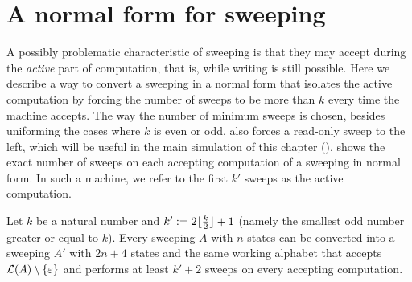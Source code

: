 \section{A normal form for sweeping \kDLAs}\label{sec:equiv-swep-dla}
A possibly problematic characteristic of sweeping \kDLAs is that they may accept during the \emph{active} part of computation, that is, while writing is still possible.
Here we describe a way to convert a sweeping \kDLA in a normal form that isolates the active computation by forcing the number of sweeps to be more than $k$ every time the machine accepts.
The way the number of minimum sweeps is chosen, besides uniforming the cases where $k$ is even or odd, also forces a read-only sweep to the left, which will be useful in the main simulation of this chapter ().
 shows the exact number of sweeps on each accepting computation of a sweeping \kDLA in normal form.
In such a machine, we refer to the first $k'$ sweeps as the active computation.
\begin{thrm}\label{thm:equiv-swep-dla}
	Let $k$ be a natural number and $k':=2\lfloor \frac{k}{2} \rfloor+1$ (namely the smallest odd number greater or equal to $k$).
	Every sweeping \kDLA $A$ with $n$ states can be converted into a sweeping \kDLA $A'$ with $2n+4$ states and the same working alphabet that accepts $\mathcal L(A)\setminus\{\varepsilon\}$ and performs at least $k'+2$ sweeps on every accepting computation.
\end{thrm}

